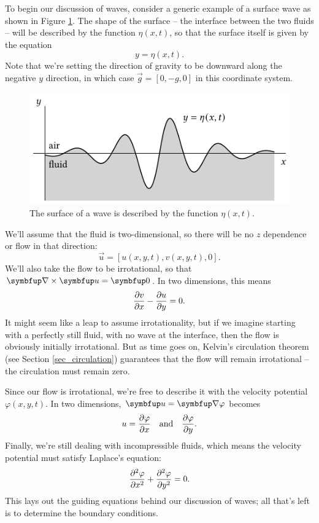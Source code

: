 To begin our discussion of waves, consider a generic example of a surface wave as shown in Figure \ref{fig_generic_wave}.  The shape of the surface -- the interface between the two fluids -- will be described by the function $\eta(x, t)$, so that the surface itself is given by the equation
\begin{equation}
y = \eta(x, t).
\end{equation}
Note that we're setting the direction of gravity to be downward along the negative $y$ direction, in which case $\vec{g} = [0, -g, 0]$ in this coordinate system.

\begin{figure}
\centering\includegraphics[width=0.8\linewidth]{Figures/Chapter5/fig_generic_wave}
\caption{The surface of a wave is described by the function $\eta(x, t)$.}
\label{fig_generic_wave}
\end{figure}

We'll assume that the fluid is two-dimensional, so there will be no $z$ dependence or flow in that direction:
\[
\vec{u} = [u(x, y, t), v(x, y, t), 0].
\]
We'll also take the flow to be irrotational, so that $\curl \vec{u} = \vec{0}$.  In two dimensions, this means
\[
\frac{\partial {v}}{\partial {x}} - \frac{\partial {u}}{\partial {y}} = 0.
\]
It might seem like a leap to assume irrotationality, but if we imagine starting with a perfectly still fluid, with no wave at the interface, then the flow is obviously initially irrotational.  But as time goes on, Kelvin's circulation theorem (see Section \ref{sec_circulation}) guarantees that the flow will remain irrotational -- the circulation must remain zero.

Since our flow is irrotational, we're free to describe it with the velocity potential $\varphi(x, y, t)$.  In two dimensions, $\vec{u} = \grad \varphi$ becomes
\begin{equation}
u = \frac{\partial {\varphi}}{\partial {x}} \quad \text{and} \quad \frac{\partial {\varphi}}{\partial {y}}.
\end{equation}
Finally, we're still dealing with incompressible fluids, which means the velocity potential must satisfy Laplace's equation:
\begin{equation}
\frac{\partial^2 {\varphi}}{\partial {x}^2} + \frac{\partial^2 {\varphi}}{\partial {y}^2} = 0.
\end{equation}
This lays out the guiding equations behind our discussion of waves; all that's left is to determine the boundary conditions.

